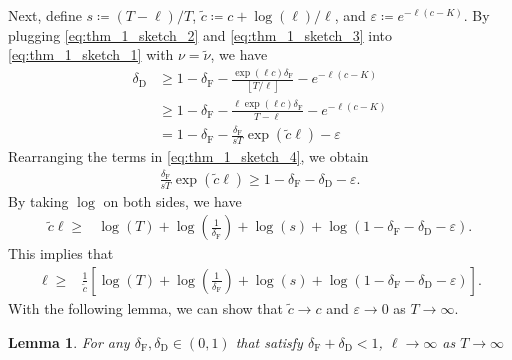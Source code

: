 \documentclass[12pt]{interact}
\newcommand{\tilnu}{\tilde{\nu}}
\newcommand{\lp}{\left(}
\newcommand{\rp}{\right)}
\newcommand{\lb}{\left[}
\newcommand{\rb}{\right]}
\newcommand{\lfl}{\left\lfloor}
\newcommand{\rfl}{\right\rfloor}
\theoremstyle{plain}
\newtheorem{lemma}{Lemma}
\begin{document}
Next, define $s \coloneqq \lp T - \ell \rp/T$, $\tilde{c} \coloneqq c + \log\lp \ell\rp / \ell$, and $\varepsilon \coloneqq e^{-\ell\lp c-K\rp}$. By plugging \eqref{eq:thm_1_sketch_2} and \eqref{eq:thm_1_sketch_3} into \eqref{eq:thm_1_sketch_1} with $\nu=\tilnu$, we have 
%
\begin{align}
\delta_{\mathrm{D}}
&\geq1-\delta_{\mathrm{F}}-\frac{\exp\lp \ell c\rp\delta_{\mathrm{F}}}{\lfl T/\ell\rfl}-e^{-\ell\lp c-K\rp} \nonumber\\
&\geq 1-\delta_{\mathrm{F}}-\frac{\ell\exp\lp \ell c\rp\delta_{\mathrm{F}}}{T-\ell}-e^{-\ell\lp c-K\rp} \nonumber\\
&=1-\delta_{\mathrm{F}}-\frac{\delta_{\mathrm{F}}}{sT}\exp\lp\tilde{c}\ell\rp-\varepsilon\label{eq:thm_1_sketch_4}
\end{align}
%
Rearranging the terms in \eqref{eq:thm_1_sketch_4}, we obtain
%
\begin{align}
\frac{\delta_{\mathrm{F}}}{sT}\exp\lp\tilde{c}\ell\rp\geq1-\delta_{\mathrm{F}}-\delta_{\mathrm{D}}-\varepsilon.\label{eq:thm_1_sketch_6}
\end{align}
By taking $\log$ on both sides, we have
%
\begin{align}
\tilde{c}\ell\geq&\log\lp T\rp+\log\lp\frac{1}{\delta_{\mathrm{F}}}\rp+\log\lp s\rp+\log\lp1-\delta_{\mathrm{F}}-\delta_{\mathrm{D}}-\varepsilon\rp. \label{eq:thm_1_sketch_7}
\end{align}
%
This implies that
%
\begin{align}
\ell\geq&\frac{1}{\tilde{c}}\lb\log\lp T\rp+\log\lp\frac{1}{\delta_{\mathrm{F}}}\rp+\log\lp s\rp+\log\lp1-\delta_{\mathrm{F}}-\delta_{\mathrm{D}}-\varepsilon\rp\rb.
\end{align}
%
With the following lemma, we can show that $\tilde{c} \to c$ and $\varepsilon \to 0$ as $T \to \infty$.

\begin{lemma}\label{lem:d_inf}
    For any $\delta_{\mathrm{F}},\delta_{\mathrm{D}}\in\lp0,1\rp$ that satisfy $\delta_{\mathrm{F}}+\delta_{\mathrm{D}}<1$, $\ell\rightarrow\infty$ as $T\rightarrow\infty$
\end{lemma}
\end{document}
